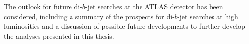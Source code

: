 The outlook for future di-$b$-jet searches at the ATLAS detector has been considered,
including a summary of the prospects for di-$b$-jet searches at high luminosities
and a discussion of possible future developments to further develop the analyses presented in this thesis.


